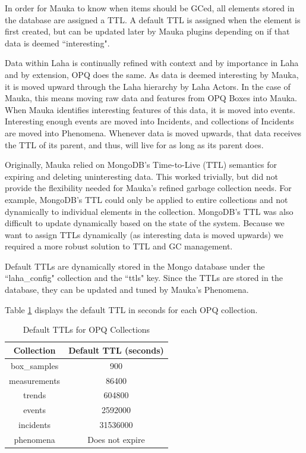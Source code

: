 In order for Mauka to know when items should be GCed, all elements stored in the database are assigned a TTL. A default TTL is assigned when the element is first created, but can be updated later by Mauka plugins depending on if that data is deemed ``interesting".

Data within Laha is continually refined with context and by importance in Laha and by extension, OPQ does the same. As data is deemed interesting by Mauka, it is moved upward through the Laha hierarchy by Laha Actors. In the case of Mauka, this means moving raw data and features from OPQ Boxes into Mauka. When Mauka identifies interesting features of this data, it is moved into events. Interesting enough events are moved into Incidents, and collections of Incidents are moved into Phenomena. Whenever data is moved upwards, that data receives the TTL of its parent, and thus, will live for as long as its parent does.  

Originally, Mauka relied on MongoDB's Time-to-Live (TTL) semantics for expiring and deleting uninteresting data. This worked trivially, but did not provide the flexibility needed for Mauka's refined garbage collection needs. For example, MongoDB's TTL could only be applied to entire collections and not dynamically to individual elements in the collection. MongoDB's TTL was also difficult to update dynamically based on the state of the system. Because we want to assign TTLs dynamically (as interesting data is moved upwards) we required a more robust solution to TTL and GC management.

Default TTLs are dynamically stored in the Mongo database under the ``laha\_config" collection and the ``ttls" key. Since the TTLs are stored in the database, they can be updated and tuned by Mauka's Phenomena.

Table \ref{table:DefaultTtls} displays the default TTL in seconds for each OPQ collection.

\begin{table}[H]
	\centering
	\caption{Default TTLs for OPQ Collections}
	\begin{tabular}{|c|c|}
		\hline 
		Collection & Default TTL (seconds) \\ 
		\hline
		box\_samples & 900 \\
		\hline
		measurements & 86400 \\
		\hline
		trends & 604800 \\
		\hline
		events & 2592000 \\
		\hline
		incidents & 31536000 \\
		\hline 
		phenomena & Does not expire \\
		\hline
	\end{tabular} 
	\label{table:DefaultTtls}
\end{table}

